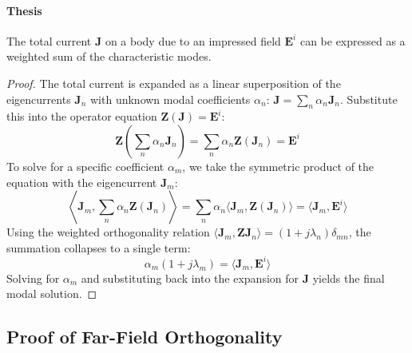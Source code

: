 \documentclass[11pt, a4paper]{report}
\begin{document}
\paragraph{Thesis} The total current $\mathbf{J}$ on a body due to an impressed field $\mathbf{E}^i$ can be expressed as a weighted sum of the characteristic modes.
\begin{proof}
The total current is expanded as a linear superposition of the eigencurrents $\mathbf{J}_n$ with unknown modal coefficients $\alpha_n$: $\mathbf{J} = \sum_n \alpha_n \mathbf{J}_n$. Substitute this into the operator equation $\mathbf{Z}(\mathbf{J})=\mathbf{E}^i$:
\begin{equation}
\mathbf{Z}\left(\sum_n \alpha_n \mathbf{J}_n\right) = \sum_n \alpha_n \mathbf{Z}(\mathbf{J}_n) = \mathbf{E}^i
\end{equation}
To solve for a specific coefficient $\alpha_m$, we take the symmetric product of the equation with the eigencurrent $\mathbf{J}_m$:
\begin{equation}
\left\langle \mathbf{J}_m, \sum_n \alpha_n \mathbf{Z}(\mathbf{J}_n) \right\rangle = \sum_n \alpha_n \langle \mathbf{J}_m, \mathbf{Z}(\mathbf{J}_n) \rangle = \langle \mathbf{J}_m, \mathbf{E}^i \rangle
\end{equation}
Using the weighted orthogonality relation $\langle \mathbf{J}_m, \mathbf{Z}\mathbf{J}_n \rangle = (1+j\lambda_n)\delta_{mn}$, the summation collapses to a single term:
\begin{equation}
\alpha_m (1+j\lambda_m) = \langle \mathbf{J}_m, \mathbf{E}^i \rangle
\end{equation}
Solving for $\alpha_m$ and substituting back into the expansion for $\mathbf{J}$ yields the final modal solution.
\end{proof}

\subsection{Proof of Far-Field Orthogonality} \label{ssec:proof_ff}
\end{document}
